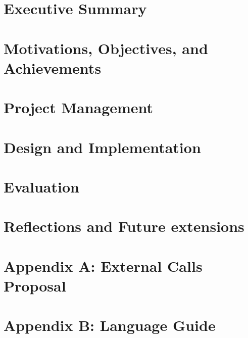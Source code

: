 \documentclass[12pt,twoside]{report}
\begin{document}


\clearpage{\pagestyle{empty}\cleardoublepage}
\setcounter{page}{1}
\pagestyle{fancy}

\tableofcontents
\clearpage{\pagestyle{empty}\cleardoublepage}
\setcounter{page}{1}
\fancyhead[LE,RO]{\slshape \rightmark}
\fancyhead[LO,RE]{\slshape \leftmark}

\chapter{Executive Summary}


\chapter{Motivations, Objectives, and Achievements}


\chapter{Project Management}


\chapter{Design and Implementation}
\label{chp:di}






\chapter{Evaluation}


\chapter{Reflections and Future extensions}


\printbibliography[heading=bibintoc]


\chapter*{Appendix A: External Calls Proposal}
\label{chp:appendix-a}


\chapter*{Appendix B: Language Guide}
\label{chp:appendix-b}

\end{document}
